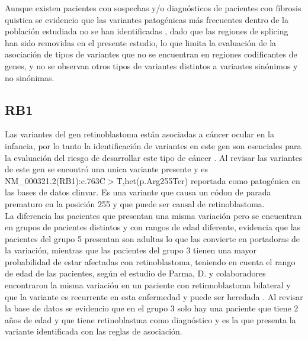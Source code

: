 Aunque existen pacientes con sospechas y/o diagnósticos de pacientes con fibrosis quistica se evidencio que las variantes patogénicas más frecuentes dentro de la población estudiada no se han identificadas \cite{Vasquez2010}, dado que las regiones de splicing han sido removidas en el presente estudio, lo que limita la evaluación de la asociación de tipos de variantes que no se encuentran en regiones codificantes de genes, y no se observan otros tipos de variantes distintos a variantes sinónimos y no sinónimas.


\subsection*{RB1}

Las variantes del gen retinoblastoma están asociadas a cáncer ocular en la infancia, por lo tanto la identificación de variantes en este gen son esenciales para la evaluación del riesgo de desarrollar este tipo de cáncer \cite{Parma2017}. Al revisar las variantes de este gen se encontró una unica variante presente   y es NM\_000321.2(RB1):c.763C$>$T,het(p.Arg255Ter) reportada como patogénica en las bases de datos clinvar. Es una variante que causa un códon de parada prematuro en la posición 255 y que puede ser causal de retinoblastoma. \\  

La diferencia  las pacientes que presentan una misma variación pero se encuentran en grupos de pacientes distintos y con rangos de edad diferente, evidencia que las pacientes del grupo 5 presentan son adultas lo que las convierte en portadoras de la variación, mientras que las pacientes del grupo 3 tienen una mayor probabilidad de estar afectadas con retinoblastoma, teniendo en cuenta el rango de edad de las pacientes, según el estudio de Parma, D. y colaboradores encontraron la misma variación en un paciente con retinnoblastoma bilateral y que la variante es recurrente en esta enfermedad y puede ser heredada \cite{Parma2017}. Al revisar la base de datos se evidencio que en el grupo 3 solo hay una paciente que tiene 2 años de edad y que tiene retinoblastma como diagnóstico y es la que presenta la variante identificada con las reglas de asociación. \\

